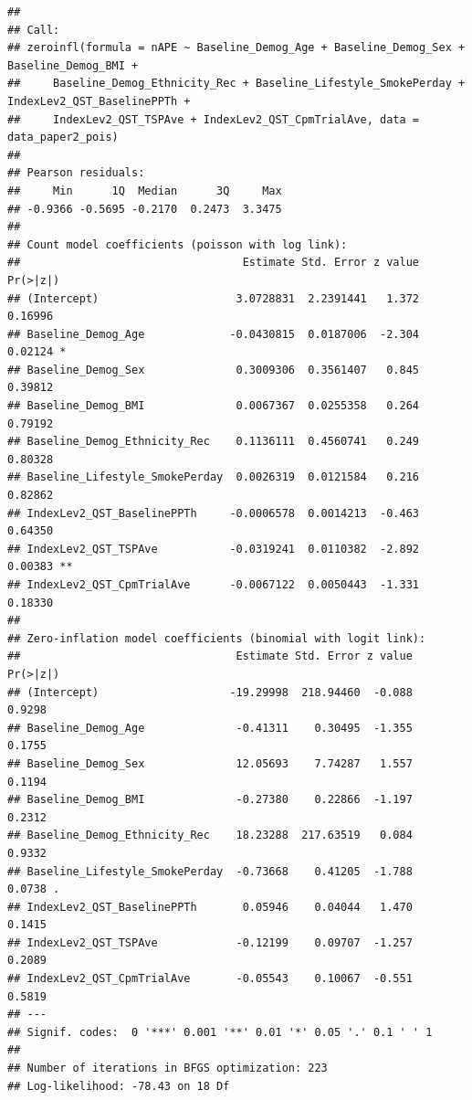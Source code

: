 \documentclass[
  12pt,
]{article}
\begin{document}
\begin{verbatim}
## 
## Call:
## zeroinfl(formula = nAPE ~ Baseline_Demog_Age + Baseline_Demog_Sex + Baseline_Demog_BMI + 
##     Baseline_Demog_Ethnicity_Rec + Baseline_Lifestyle_SmokePerday + IndexLev2_QST_BaselinePPTh + 
##     IndexLev2_QST_TSPAve + IndexLev2_QST_CpmTrialAve, data = data_paper2_pois)
## 
## Pearson residuals:
##     Min      1Q  Median      3Q     Max 
## -0.9366 -0.5695 -0.2170  0.2473  3.3475 
## 
## Count model coefficients (poisson with log link):
##                                  Estimate Std. Error z value Pr(>|z|)   
## (Intercept)                     3.0728831  2.2391441   1.372  0.16996   
## Baseline_Demog_Age             -0.0430815  0.0187006  -2.304  0.02124 * 
## Baseline_Demog_Sex              0.3009306  0.3561407   0.845  0.39812   
## Baseline_Demog_BMI              0.0067367  0.0255358   0.264  0.79192   
## Baseline_Demog_Ethnicity_Rec    0.1136111  0.4560741   0.249  0.80328   
## Baseline_Lifestyle_SmokePerday  0.0026319  0.0121584   0.216  0.82862   
## IndexLev2_QST_BaselinePPTh     -0.0006578  0.0014213  -0.463  0.64350   
## IndexLev2_QST_TSPAve           -0.0319241  0.0110382  -2.892  0.00383 **
## IndexLev2_QST_CpmTrialAve      -0.0067122  0.0050443  -1.331  0.18330   
## 
## Zero-inflation model coefficients (binomial with logit link):
##                                 Estimate Std. Error z value Pr(>|z|)  
## (Intercept)                    -19.29998  218.94460  -0.088   0.9298  
## Baseline_Demog_Age              -0.41311    0.30495  -1.355   0.1755  
## Baseline_Demog_Sex              12.05693    7.74287   1.557   0.1194  
## Baseline_Demog_BMI              -0.27380    0.22866  -1.197   0.2312  
## Baseline_Demog_Ethnicity_Rec    18.23288  217.63519   0.084   0.9332  
## Baseline_Lifestyle_SmokePerday  -0.73668    0.41205  -1.788   0.0738 .
## IndexLev2_QST_BaselinePPTh       0.05946    0.04044   1.470   0.1415  
## IndexLev2_QST_TSPAve            -0.12199    0.09707  -1.257   0.2089  
## IndexLev2_QST_CpmTrialAve       -0.05543    0.10067  -0.551   0.5819  
## ---
## Signif. codes:  0 '***' 0.001 '**' 0.01 '*' 0.05 '.' 0.1 ' ' 1 
## 
## Number of iterations in BFGS optimization: 223 
## Log-likelihood: -78.43 on 18 Df
\end{verbatim}
\end{document}
